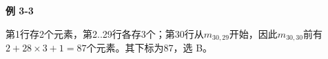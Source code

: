 {\color{ink}\bfseries 例 3-3}\par\vspace{1bp}第1行存2个元素，第2..29行各存3个；第30行从\(m_{30,\allowbreak{}29}\)开始，因此\(m_{30,\allowbreak{}30}\)前有\(2+\allowbreak{}28\times 3+\allowbreak{}1=\allowbreak{}87\)个元素。其下标为87，选 B。
